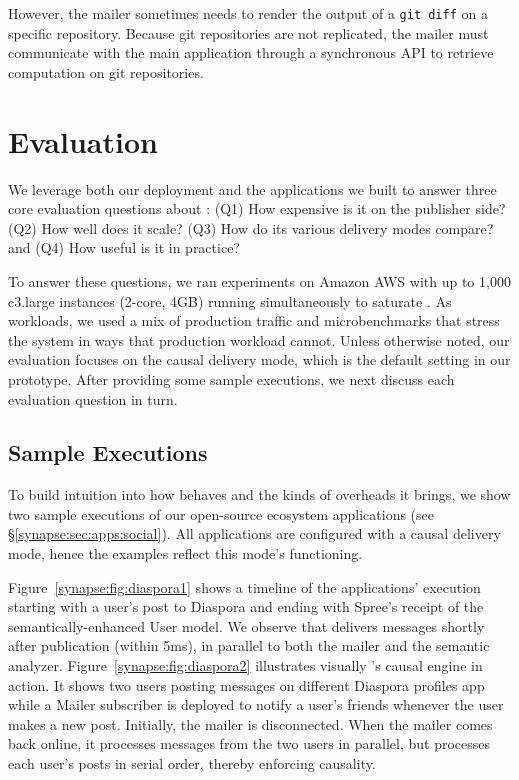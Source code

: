 However, the mailer sometimes needs to render the output of a {\tt git diff} on
a specific repository. Because git repositories are not replicated, the mailer
must communicate with the main application through a synchronous API to
retrieve computation on git repositories.

\section{Evaluation}
\label{synapse:sec:evaluation}

We leverage both our deployment and the applications we built to answer three
core evaluation questions about \synapse: (Q1) How expensive is it
on the publisher side? (Q2) How well does it scale? (Q3) How do its various
delivery modes compare? and (Q4) How useful is it in practice?

To answer these questions, we ran experiments on Amazon AWS with up to 1,000
c3.large instances (2-core, 4GB) running simultaneously to saturate \synapse.
As workloads, we used a mix of \crowdtap production traffic and microbenchmarks
that stress the system in ways that production workload cannot.  Unless
otherwise noted, our evaluation focuses on the causal delivery mode, which is
the default setting in our prototype.  After providing some sample executions,
we next discuss each evaluation question in turn.

\subsection{Sample Executions}
\label{synapse:sec:evaluation:sample-runs}

To build intuition into how \synapse behaves and the kinds of overheads it
brings, we show two sample executions of our open-source ecosystem
applications (see \S\ref{synapse:sec:apps:social}). All applications are configured
with a causal delivery mode, hence the examples reflect this mode's functioning.

Figure~\ref{synapse:fig:diaspora1} shows a timeline of the applications' execution
starting with a user's post to Diaspora and ending with Spree's receipt of the
semantically-enhanced User model. We observe that \synapse delivers messages
shortly after publication (within 5ms), in parallel to both the mailer and
the semantic analyzer.  Figure~\ref{synapse:fig:diaspora2}  illustrates visually
\synapse's causal engine in action. It shows two users posting messages on
different Diaspora profiles app while a Mailer subscriber is deployed to notify
a user's friends whenever the user makes a new post.  Initially, the mailer is
disconnected. When the mailer comes back online, it processes messages from the
two users in parallel, but processes each user's posts in serial order, thereby
enforcing causality.

